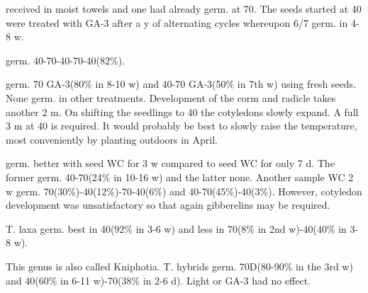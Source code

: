 \begin{description}
received in moist towels and one had already germ. at 70. The seeds started at 40
were treated with GA-3 after a y of alternating cycles whereupon 6/7 germ. in 4-8 w.
\item[T. pusillum] germ. 40-70-40-70-40(82\%).
\item[T. tschonoski] germ. 70 GA-3(80\% in 8-10 w) and 40-70 GA-3(50\% in 7th w)
using fresh seeds. None germ. in other treatments. Development of the corm and
radicle takes another 2 m. On shifting the seedlings to 40 the cotyledons slowly
expand. A full 3 m at 40 is required. It would probably be best to slowly raise the
temperature, most conveniently by planting outdoors in April.
\item[T. vaseyi] germ. better with seed WC for 3 w compared to seed WC for only 7 d.
The former germ. 40-70(24\% in 10-16 w) and the latter none. Another sample WC 2 w
germ. 70(30\%)-40(12\%)-70-40(6\%) and 40-70(45\%)-40(3\%). However, cotyledon
development was unsatisfactory so that again gibberelins may be required.
\item[Tritelela (Liliaceae)] T. laxa germ. best in 40(92\% in 3-6 w) and less in
70(8\% in 2nd w)-40(40\% in 3-8 w).
\item[Tritoma (Liliaceae)] This genus is also called Kniphotia. T. hybrids germ.
70D(80-90\% in the 3rd w) and 40(60\% in 6-11 w)-70(38\% in 2-6 d). Light or GA-3 had
no effect.


\end{description}
